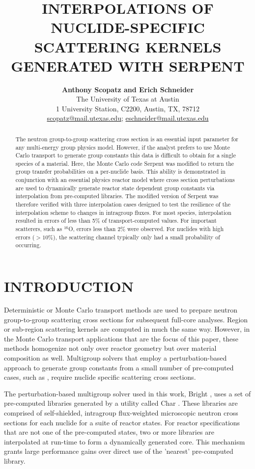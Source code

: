 \documentclass{physor2012}
\title{INTERPOLATIONS OF NUCLIDE-SPECIFIC SCATTERING KERNELS \\
       GENERATED WITH SERPENT}
\author{%
  \textbf{Anthony Scopatz and Erich Schneider} \\
  The University of Texas at Austin \\
  1 University Station, C2200, Austin, TX, 78712 \\
  \url{scopatz@mail.utexas.edu}; \url{eschneider@mail.utexas.edu} \\
}
\newcommand{\superscript}[1]{\ensuremath{^{\textrm{#1}}}}
\newcommand{\nuc}[2]{\superscript{#2}{#1}}
\begin{document}
\maketitle
\begin{abstract}
    The neutron group-to-group scattering cross section is an essential
    input parameter for any multi-energy group physics model.  However,
    if the analyst prefers to use Monte Carlo transport to generate group 
    constants this data is difficult to obtain for a single species of a material.  
    Here, the Monte Carlo code Serpent was modified to return the group transfer 
    probabilities on a per-nuclide basis.  This ability is demonstrated in conjunction with
    an essential physics reactor model where cross section perturbations
    are used to dynamically generate reactor state dependent group constants via 
    interpolation from pre-computed libraries.  The modified version of Serpent was 
    therefore verified with three interpolation cases designed to test the resilience 
    of the interpolation scheme to changes in intragroup fluxes.  For most species, 
    interpolation resulted in errors of less than 5\% of transport-computed values.  
    For important scatterers, such as \nuc{O}{16}, errors less than 2\% were observed.
    For nuclides with high errors ($>10\%$), the scattering channel typically
    only had a small probability of occurring.
\end{abstract}


\section{INTRODUCTION}
Deterministic or Monte Carlo transport methods are used to prepare neutron group-to-group scattering cross sections for subsequent full-core analyses.  Region or sub-region scattering kernels are computed in much
the same way.  However, in the Monte Carlo transport applications that are the focus of this paper, these methods homogenize not only over reactor geometry but over material composition as well.  Multigroup solvers that employ a perturbation-based approach to generate group constants from a small number of pre-computed cases, such as \cite{}, require nuclide specific scattering cross sections.

The perturbation-based multigroup solver used in this work, Bright \cite{}, uses a
set of pre-computed libraries generated by a utility called Char \cite{}.
These libraries are comprised of self-shielded, intragroup flux-weighted microscopic neutron cross sections for each nuclide for a suite of reactor states.  For reactor
specifications that are not one of the pre-computed states, two or more libraries
are interpolated at run-time to form a dynamically generated core.  This mechanism
grants large performance gains over direct use of the 'nearest' pre-computed library.
\end{document}
